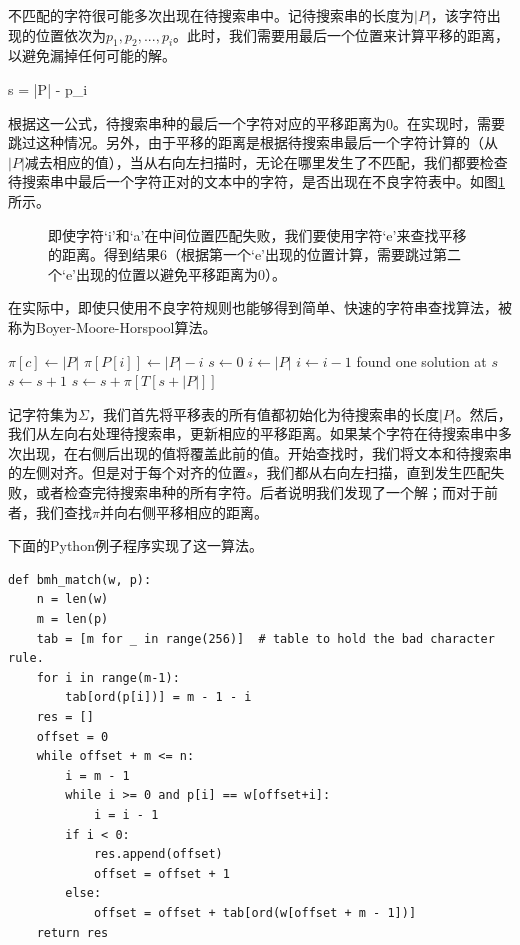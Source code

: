 \documentclass[UTF8]{article}
\begin{document}
不匹配的字符很可能多次出现在待搜索串中。记待搜索串的长度为$|P|$，该字符出现的位置依次为$p_1, p_2, ..., p_i$。此时，我们需要用最后一个位置来计算平移的距离，以避免漏掉任何可能的解。

\be
s = |P| - p_i
\ee

根据这一公式，待搜索串种的最后一个字符对应的平移距离为0。在实现时，需要跳过这种情况。另外，由于平移的距离是根据待搜索串最后一个字符计算的（从$|P|$减去相应的值），当从右向左扫描时，无论在哪里发生了不匹配，我们都要检查待搜索串中最后一个字符正对的文本中的字符，是否出现在不良字符表中。如图\ref{fig:good-char-2}所示。

\begin{figure}[htbp]
 \centering
 \caption{即使字符‘i’和‘a’在中间位置匹配失败，我们要使用字符‘e’来查找平移的距离。得到结果6（根据第一个‘e’出现的位置计算，需要跳过第二个‘e’出现的位置以避免平移距离为0）。}
 \label{fig:good-char-2}
\end{figure}

在实际中，即使只使用不良字符规则也能够得到简单、快速的字符串查找算法，被称为Boyer-Moore-Horspool算法\cite{boyer-moore-horspool}。

\begin{algorithmic}[1]
    \State $\pi[c] \gets |P|$
  \EndFor
   
    \State $\pi[P[i]] \gets |P| - i$
  \EndFor
  \State $s \gets 0$
    \State $i \gets |P|$
     
      \State $i \gets i - 1$
    \EndWhile
      \State found one solution at $s$
      \State $s \gets s + 1$ 
    \Else
      \State $s \gets s + \pi[T[s + |P|]]$
    \EndIf
  \EndWhile
\EndProcedure
\end{algorithmic}

记字符集为$\Sigma$，我们首先将平移表的所有值都初始化为待搜索串的长度$|P|$。然后，我们从左向右处理待搜索串，更新相应的平移距离。如果某个字符在待搜索串中多次出现，在右侧后出现的值将覆盖此前的值。开始查找时，我们将文本和待搜索串的左侧对齐。但是对于每个对齐的位置$s$，我们都从右向左扫描，直到发生匹配失败，或者检查完待搜索串种的所有字符。后者说明我们发现了一个解；而对于前者，我们查找$\pi$并向右侧平移相应的距离。

下面的Python例子程序实现了这一算法。

\lstset{language=Python}
\begin{lstlisting}
def bmh_match(w, p):
    n = len(w)
    m = len(p)
    tab = [m for _ in range(256)]  # table to hold the bad character rule.
    for i in range(m-1):
        tab[ord(p[i])] = m - 1 - i
    res = []
    offset = 0
    while offset + m <= n:
        i = m - 1
        while i >= 0 and p[i] == w[offset+i]:
            i = i - 1
        if i < 0:
            res.append(offset)
            offset = offset + 1
        else:
            offset = offset + tab[ord(w[offset + m - 1])]
    return res
\end{lstlisting}
\end{document}

